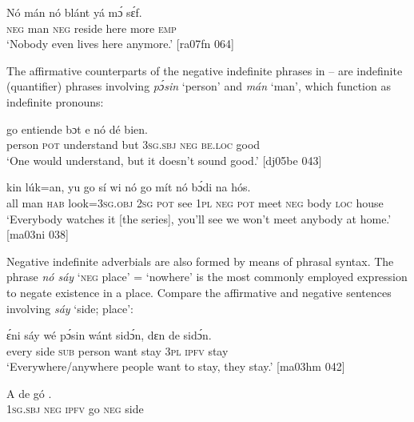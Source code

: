 \ea%
    \label{ex:key:562}
    \gll Nó  mán    nó  blánt  yá    mɔ́    sɛ́f.\\
\textsc{neg}  man    \textsc{neg}  reside  here    more  \textsc{emp}\\

\glt ‘Nobody even lives here anymore.’ [ra07fn 064]
\z

The affirmative counterparts of the negative indefinite phrases in – are indefinite (quantifier) phrases involving \textit{pɔ́sin} ‘person’ and \textit{mán} ‘man’, which function as indefinite pronouns:


\ea%
    \label{ex:key:563}
    \gll {}  go  entiende    bɔt  e    nó  dé    bien.\\
person  \textsc{pot}  understand  but  \textsc{3sg.sbj}  \textsc{neg}  \textsc{be.loc}  good\\

\glt ‘One would understand, but it doesn’t sound good.’ [dj05be 043]
\z


\ea%
    \label{ex:key:564}
    \gll {}   kin  lúk=an,    yu  go  sí  wi  nó  go
mít    nó  bɔ́di    na  hós.\\
all  man    \textsc{hab}  look=\textsc{3sg.obj}  \textsc{2sg}  \textsc{pot}  see  \textsc{1pl}  \textsc{neg}  \textsc{pot}
meet  \textsc{neg}  body  \textsc{loc}  house\\

\glt ‘Everybody watches it [the series], you’ll see we won’t 
meet anybody at home.’ [ma03ni 038]
\z

Negative indefinite adverbials are also formed by means of phrasal syntax. The phrase \textit{nó sáy} ‘\textsc{neg} place’ = ‘nowhere’ is the most commonly employed expression to negate existence in a place. Compare the affirmative and negative sentences involving \textit{sáy} ‘side; place’: 


\ea%
    \label{ex:key:565}
    \gll ɛ́ni    sáy  wé  pɔ́sin  wánt  sidɔ́n,  dɛn  de  sidɔ́n.\\
every  side  \textsc{sub}  person  want  stay    \textsc{3pl}  \textsc{ipfv}  stay\\

\glt ‘Everywhere/anywhere people want to stay, they stay.’ [ma03hm 042]
\z


\ea%
    \label{ex:key:566}
    \gll \MakeUppercase{A}     de  gó    .\\
\textsc{1sg.sbj}  \textsc{neg}  \textsc{ipfv}  go  \textsc{neg}  side\\

